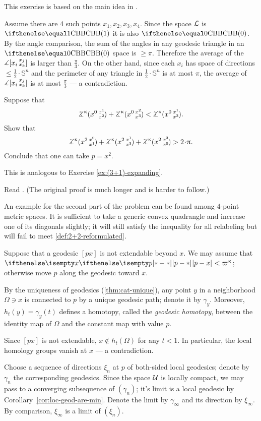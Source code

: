 This exercise is based on the main idea in \cite{hsiang-kleiner}.

\medskip

Assume there are 4 such points $x_1,x_2,x_3,x_4$.
Since the space $\mathcal{L}$ is $\Alex{1}$ it is also $\Alex{0}$.
By the angle comparison, the sum of the angles in any geodesic triangle in an $\Alex{0}$ space is $\ge \pi$.
Therefore the average of the $\measuredangle[x_i\,{}^{x_j}_{x_k}]$ is  larger than $\tfrac\pi3$.
On the other hand, since each $x_i$ has space of directions $\le\tfrac12\cdot\mathbb{S}^n$ and the perimeter of any triangle in $\tfrac12\cdot\mathbb{S}^n$ is at most $\pi$, the average of $\measuredangle[x_i\,{}^{x_j}_{x_k}]$ is at most $\tfrac\pi3$ --- a contradiction.


Suppose that 
\[\angk\kappa {x^0}{x^1}{x^2}+\angk\kappa {x^0}{x^2}{x^3}<\angk\kappa {x^0}{x^1}{x^3}.\]
Show that
\[\angk\kappa {x^2}{x^0}{x^1}+\angk\kappa {x^2}{x^1}{x^3}+\angk\kappa {x^2}{x^3}{x^0}>2\cdot\pi.\]
Conclude that one can take $p=x^2$.

This is analogous to Exercise \ref{ex:(3+1)-expanding}.

 Read \cite{sato}. (The original proof \cite{berg-nikolaev} is much longer and is harder to follow.)

An example for the second part of the problem can be found among 4-point metric spaces.
It is sufficient to take a generic convex quadrangle and increase one of its diagonals slightly;
it will still satisfy the inequality for all relabeling but will fail to meet \ref{def:2+2-reformulated}.

Suppose that a geodesic $[px]$ is not extendable beyond $x$.
We may assume that $\dist{p}{x}{}<\varpi\kappa$;
otherwise move $p$ along the geodesic toward  $x$.

By the uniqueness of geodesics (\ref{thm:cat-unique}), any point $y$ in a neighborhood $\Omega\ni x$ is connected to $p$ by a unique geodesic path; denote it by $\gamma_y$.
Moreover, $h_t(y)=\gamma_y(t)$ defines a homotopy, called the  \emph{geodesic homotopy}, between the identity map of $\Omega$ and the constant map with value $p$.

Since $[px]$ is not extendable, $x\notin h_t(\Omega)$ for any $t<1$.
In particular, the local homology groups vanish at $x$ --- a contradiction.

 Choose a sequence of 
directions $\xi_n$ at $p$
of both-sided local geodesics; denote by $\gamma_n$ the corresponding geodesics.
Since the space $\mathcal{U}$ is locally compact, we may pass to a converging subsequence of $(\gamma_n)$; it's limit is a local geodesic by Corollary~\ref{cor:loc-geod-are-min}.
Denote the limit by  $\gamma_\infty$ and its direction by $\xi_\infty$.
By comparison, $\xi_\infty$ is a limit of $(\xi_n)$.

